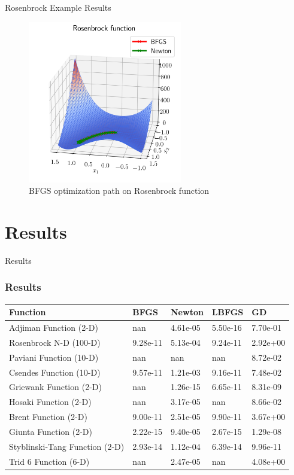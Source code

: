 \documentclass{beamer}
\begin{document}
\begin{frame}{Rosenbrock Example Results}
	\begin{figure}
		\centering
		\includegraphics[width=0.6\textwidth]{./figs/rosenbrock_surface.png}
		\caption{BFGS optimization path on Rosenbrock function}
	\end{figure}
\end{frame}
\section{Results}
\begin{frame}{Results}
	\frametitle{Results}
	\tabcolsep=0.11cm
	\begin{tabular}{|l|l|l|l|l|}
		\hline
		Function                       & BFGS     & Newton   & LBFGS    & GD       \\
		\hline
		Adjiman Function (2-D)         & nan      & 4.61e-05 & 5.50e-16 & 7.70e-01 \\
		\hline
		Rosenbrock N-D (100-D)         & 9.28e-11 & 5.13e-04 & 9.24e-11 & 2.92e+00 \\
		\hline
		Paviani Function (10-D)        & nan      & nan      & nan      & 8.72e-02 \\
		\hline
		Csendes Function (10-D)        & 9.57e-11 & 1.21e-03 & 9.16e-11 & 7.48e-02 \\
		\hline
		Griewank Function (2-D)        & nan      & 1.26e-15 & 6.65e-11 & 8.31e-09 \\
		\hline
		Hosaki Function (2-D)          & nan      & 3.17e-05 & nan      & 8.66e-02 \\
		\hline
		Brent Function (2-D)           & 9.00e-11 & 2.51e-05 & 9.90e-11 & 3.67e+00 \\
		\hline
		Giunta Function (2-D)          & 2.22e-15 & 9.40e-05 & 2.67e-15 & 1.29e-08 \\
		\hline
		Styblinski-Tang Function (2-D) & 2.93e-14 & 1.12e-04 & 6.39e-14 & 9.96e-11 \\
		\hline
		Trid 6 Function (6-D)          & nan      & 2.47e-05 & nan      & 4.08e+00 \\
		\hline
		\hline
	\end{tabular}

\end{frame}
\end{document}

